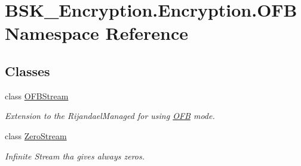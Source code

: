 \hypertarget{namespace_b_s_k___encryption_1_1_encryption_1_1_o_f_b}{}\section{B\+S\+K\+\_\+\+Encryption.\+Encryption.\+O\+FB Namespace Reference}
\label{namespace_b_s_k___encryption_1_1_encryption_1_1_o_f_b}
\subsection*{Classes}
\begin{DoxyCompactItemize}
\item 
class \mbox{\hyperlink{class_b_s_k___encryption_1_1_encryption_1_1_o_f_b_1_1_o_f_b_stream}{O\+F\+B\+Stream}}
\begin{DoxyCompactList}\small\item\em Extension to the Rijandael\+Managed for using \mbox{\hyperlink{namespace_b_s_k___encryption_1_1_encryption_1_1_o_f_b}{O\+FB}} mode. \end{DoxyCompactList}\item 
class \mbox{\hyperlink{class_b_s_k___encryption_1_1_encryption_1_1_o_f_b_1_1_zero_stream}{Zero\+Stream}}
\begin{DoxyCompactList}\small\item\em Infinite Stream tha gives always zeros. \end{DoxyCompactList}\end{DoxyCompactItemize}
